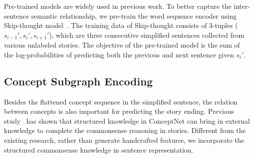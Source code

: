 Pre-trained models are widely used in previous work.
To better capture the inter-sentence semantic relationship,
we pre-train the word sequence encoder using Skip-thought model~\cite{kiros2015skip}.
The training data of Skip-thought consists of 3-tuples
($s_{i-1}', s_i', s_{i+1}'$), which are three consecutive simplified sentences
collected from various unlabeled stories.
The objective of the pre-trained model is the sum of the log-probabilities
of predicting both the previous and next sentence given $s_i'$.







\subsection*{Concept Subgraph Encoding}

Besides the flattened concept sequence in the simplified sentence, 
the relation between concepts is also important for 
predicting the story ending. 
Previous study~\cite{chen2018incorporating, guan2018story} 
has shown that structured knowledge in ConceptNet can bring in external 
knowledge to complete the commonsense reasoning in stories.
Different from the existing research,
rather than generate handcrafted features,
we incorporate the structured commonsense knowledge
in sentence representation. 

